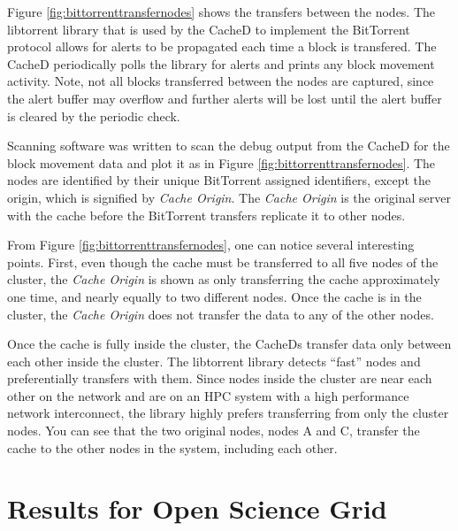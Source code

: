 Figure \ref{fig:bittorrenttransfernodes} shows the transfers between the nodes.  The libtorrent library that is used by the CacheD to implement the BitTorrent protocol allows for alerts to be propagated each time a block is transfered.  The CacheD periodically polls the library for alerts and prints any block movement activity. Note, not all blocks transferred between the nodes are captured, since the alert buffer may overflow and further alerts will be lost until the alert buffer is cleared by the periodic check.

Scanning software was written to scan the debug output from the CacheD for the block movement data and plot it as in Figure \ref{fig:bittorrenttransfernodes}.  The nodes are identified by their unique BitTorrent assigned identifiers, except the origin, which is signified by \textit{Cache Origin}.  The \textit{Cache Origin} is the original server with the cache before the BitTorrent transfers replicate it to other nodes.

From Figure \ref{fig:bittorrenttransfernodes}, one can notice several interesting points.  First, even though the cache must be transferred to all five nodes of the cluster, the \textit{Cache Origin} is shown as only transferring the cache approximately one time, and nearly equally to two different nodes.  Once the cache is in the cluster, the \textit{Cache Origin} does not transfer the data to any of the other nodes.  

Once the cache is fully inside the cluster, the CacheDs transfer data only between each other inside the cluster.  The libtorrent library detects ``fast'' nodes and preferentially transfers with them.  Since nodes inside the cluster are near each other on the network and are on an HPC system with a high performance network interconnect, the library highly prefers transferring from only the cluster nodes.  You can see that the two original nodes, nodes A and C, transfer the cache to the other nodes in the system, including each other.


\section{Results for Open Science Grid}

